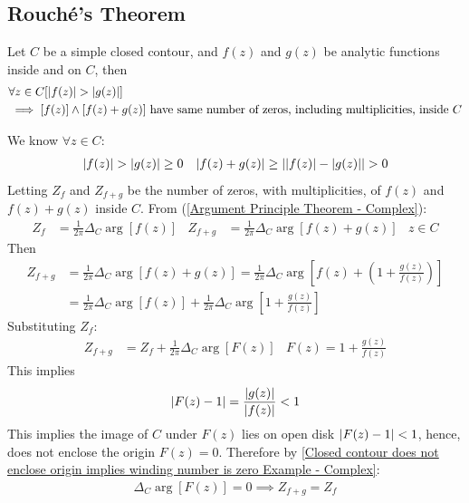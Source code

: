 \documentclass[12pt, english]{book}
\makeatletter
\renewenvironment{proof}[1][\proofname]{\par
	\pushQED{\qed}%
	\normalfont \topsep6\p@\@plus6\p@\relax
	\list{}{%
		\settowidth{\leftmargin}{\itshape\proofname:\hskip\labelsep}%
		\setlength{\labelwidth}{0pt}%
		\setlength{\itemindent}{-\leftmargin}%
		}%
	\item[\hskip\labelsep\itshape#1\@addpunct{:}]\ignorespaces
	}{\popQED\endlist\@endpefalse}
\makeatother
\begin{document}
	\subsection{Rouché's Theorem} \label{Rouche's Theorem Subsection - Complex}
	
	\begin{theorem}
		\label{Rouche's Theorem - Complex}
		Let \(C\) be a simple closed contour, and \(f(z)\) and \(g(z)\) be analytic functions inside and on \(C\), then
		\begin{align*}
			&\forall z \in C [\abs{f(z)} > \abs{g(z)}] \\
			&\implies [f(z)] \land [f(z) + g(z)] \text{ have same number of zeros, including multiplicities, inside } C
		\end{align*}
	\end{theorem}
	\begin{proof}
		We know \(\forall z \in C\):
		\begin{align*}
			\abs{f(z)} &> \abs{g(z)} \geq 0	&
			\abs{f(z) + g(z)} \geq \abs{\abs{f(z)} - \abs{g(z)}} > 0
		\end{align*}
		Letting \(Z_f\) and \(Z_{f+g}\) be the number of zeros, with multiplicities, of \(f(z)\) and \(f(z) + g(z)\) inside \(C\). From (\cref{Argument Principle Theorem - Complex}):
		\begin{align*}
			Z_f &= \frac{1}{2\pi} \Delta_{C} \arg[f(z)] &
			Z_{f+g} &= \frac{1}{2\pi} \Delta_{C} \arg[f(z) + g(z)] & z \in C
		\end{align*}
		Then
		\begin{align*}
			Z_{f+g} &= \frac{1}{2\pi} \Delta_{C} \arg[f(z) + g(z)] 
				= \frac{1}{2\pi} \Delta_{C} \arg\left[f(z) + \left(1 + \frac{g(z)}{f(z)}\right)\right] \\
				&= \frac{1}{2\pi} \Delta_{C} \arg[f(z)] + \frac{1}{2\pi} \Delta_{C} \arg\left[1 + \frac{g(z)}{f(z)}\right]
		\end{align*}
		Substituting \(Z_f\):
		\begin{align*}
			Z_{f+g} &= Z_f + \frac{1}{2\pi} \Delta_{C} \arg[F(z)] &
				F(z) = 1 + \frac{g(z)}{f(z)}
		\end{align*}
		This implies 
		\begin{align*}
			\abs{F(z) - 1} = \frac{\abs{g(z)}}{\abs{f(z)}} < 1
		\end{align*}
		This implies the image of \(C\) under \(F(z)\) lies on open disk \(\abs{F(z) - 1} < 1\), hence, does not enclose the origin \(F(z) = 0\). Therefore by \cref{Closed contour does not enclose origin implies winding number is zero Example - Complex}:
		\begin{align*}
			\Delta_{C} \arg[F(z)] = 0 \implies Z_{f+g} = Z_f
		\end{align*}
	\end{proof}
	
\end{document}
